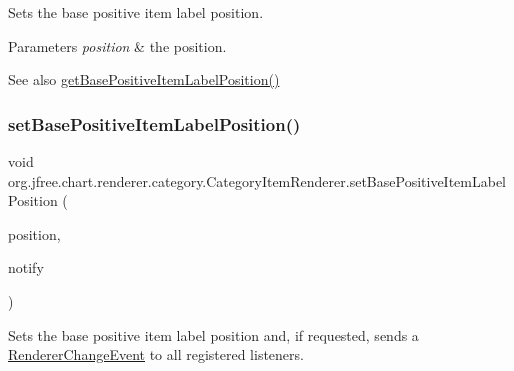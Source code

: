 Sets the base positive item label position.


\begin{DoxyParams}{Parameters}
{\em position} & the position.\\
\hline
\end{DoxyParams}
\begin{DoxySeeAlso}{See also}
\mbox{\hyperlink{interfaceorg_1_1jfree_1_1chart_1_1renderer_1_1category_1_1_category_item_renderer_aa447d7a69c2ceeed6c734eae9cb995f3}{get\+Base\+Positive\+Item\+Label\+Position()}} 
\end{DoxySeeAlso}
\mbox{\label{interfaceorg_1_1jfree_1_1chart_1_1renderer_1_1category_1_1_category_item_renderer_a381bd061c04dfb2cee72de5b5a80d7fe}} 
\subsubsection{\texorpdfstring{set\+Base\+Positive\+Item\+Label\+Position()}{setBasePositiveItemLabelPosition()}\hspace{0.1cm}{\footnotesize\ttfamily [2/2]}}
{\footnotesize\ttfamily void org.\+jfree.\+chart.\+renderer.\+category.\+Category\+Item\+Renderer.\+set\+Base\+Positive\+Item\+Label\+Position (\begin{DoxyParamCaption}\item[{\mbox{\hyperlink{classorg_1_1jfree_1_1chart_1_1labels_1_1_item_label_position}{Item\+Label\+Position}}}]{position,  }\item[{boolean}]{notify }\end{DoxyParamCaption})}

Sets the base positive item label position and, if requested, sends a \mbox{\hyperlink{}{Renderer\+Change\+Event}} to all registered listeners.


